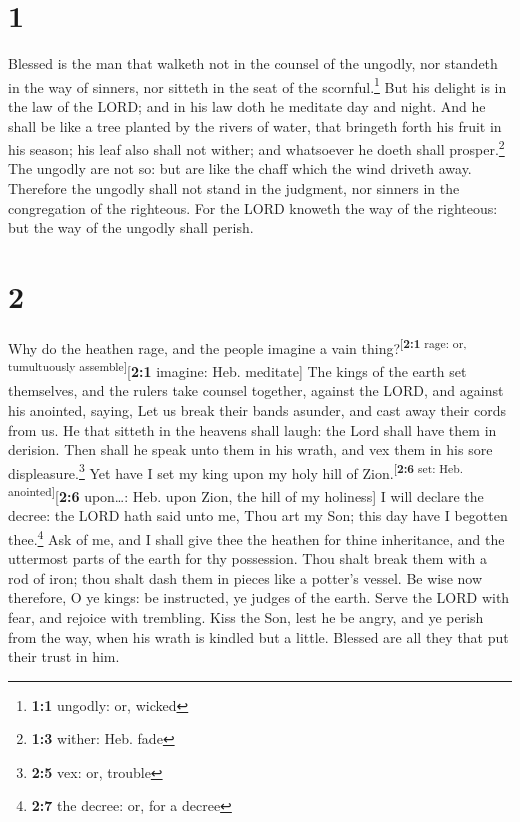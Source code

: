\hypertarget{section}{%
\section{1}\label{section}}

 Blessed is the man that walketh not in the counsel of the
ungodly, nor standeth in the way of sinners, nor sitteth in the seat of
the scornful.\footnote{\textbf{1:1} ungodly: or, wicked} 
But his delight is in the law of the LORD; and in his law doth he
meditate day and night.  And he shall be like a tree
planted by the rivers of water, that bringeth forth his fruit in his
season; his leaf also shall not wither; and whatsoever he doeth shall
prosper.\footnote{\textbf{1:3} wither: Heb. fade}  The
ungodly are not so: but are like the chaff which the wind driveth away.
 Therefore the ungodly shall not stand in the judgment,
nor sinners in the congregation of the righteous.  For the
LORD knoweth the way of the righteous: but the way of the ungodly shall
perish.

\hypertarget{section-1}{%
\section{2}\label{section-1}}

 Why do the heathen rage, and the people imagine a vain
thing?\textsuperscript{{[}\textbf{2:1} rage: or, tumultuously
assemble{]}}{[}\textbf{2:1} imagine: Heb. meditate{]}  The
kings of the earth set themselves, and the rulers take counsel together,
against the LORD, and against his anointed, saying,  Let
us break their bands asunder, and cast away their cords from us.
 He that sitteth in the heavens shall laugh: the Lord
shall have them in derision.  Then shall he speak unto
them in his wrath, and vex them in his sore displeasure.\footnote{\textbf{2:5}
  vex: or, trouble}  Yet have I set my king upon my holy
hill of Zion.\textsuperscript{{[}\textbf{2:6} set: Heb.
anointed{]}}{[}\textbf{2:6} upon\ldots: Heb. upon Zion, the hill of my
holiness{]}  I will declare the decree: the LORD hath said
unto me, Thou art my Son; this day have I begotten thee.\footnote{\textbf{2:7}
  the decree: or, for a decree}  Ask of me, and I shall
give thee the heathen for thine inheritance, and the uttermost parts of
the earth for thy possession.  Thou shalt break them with
a rod of iron; thou shalt dash them in pieces like a potter's vessel.
 Be wise now therefore, O ye kings: be instructed, ye
judges of the earth.  Serve the LORD with fear, and
rejoice with trembling.  Kiss the Son, lest he be angry,
and ye perish from the way, when his wrath is kindled but a little.
Blessed are all they that put their trust in him.

